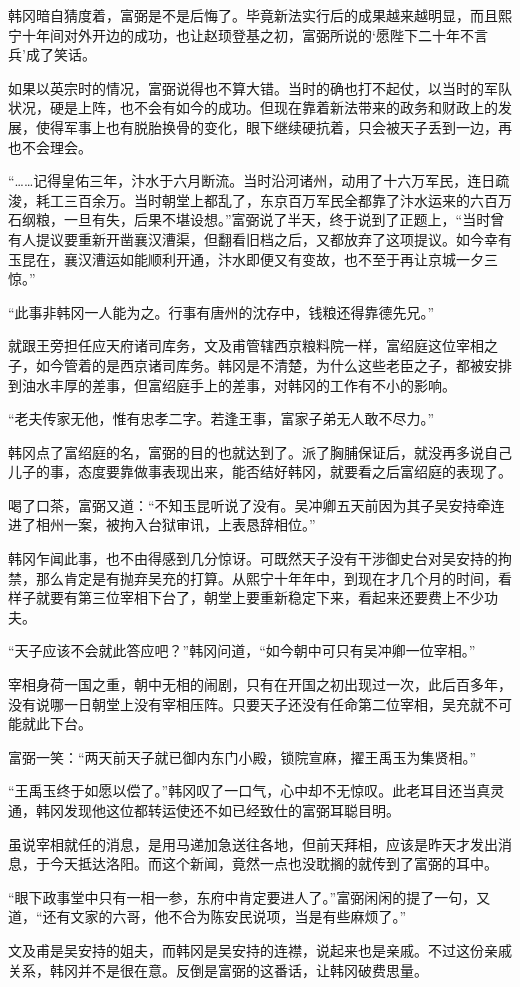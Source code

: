 韩冈暗自猜度着，富弼是不是后悔了。毕竟新法实行后的成果越来越明显，而且熙宁十年间对外开边的成功，也让赵顼登基之初，富弼所说的‘愿陛下二十年不言兵’成了笑话。

如果以英宗时的情况，富弼说得也不算大错。当时的确也打不起仗，以当时的军队状况，硬是上阵，也不会有如今的成功。但现在靠着新法带来的政务和财政上的发展，使得军事上也有脱胎换骨的变化，眼下继续硬抗着，只会被天子丢到一边，再也不会理会。

“……记得皇佑三年，汴水于六月断流。当时沿河诸州，动用了十六万军民，连日疏浚，耗工三百余万。当时朝堂上都乱了，东京百万军民全都靠了汴水运来的六百万石纲粮，一旦有失，后果不堪设想。”富弼说了半天，终于说到了正题上，“当时曾有人提议要重新开凿襄汉漕渠，但翻看旧档之后，又都放弃了这项提议。如今幸有玉昆在，襄汉漕运如能顺利开通，汴水即便又有变故，也不至于再让京城一夕三惊。”

“此事非韩冈一人能为之。行事有唐州的沈存中，钱粮还得靠德先兄。”

就跟王旁担任应天府诸司库务，文及甫管辖西京粮料院一样，富绍庭这位宰相之子，如今管着的是西京诸司库务。韩冈是不清楚，为什么这些老臣之子，都被安排到油水丰厚的差事，但富绍庭手上的差事，对韩冈的工作有不小的影响。

“老夫传家无他，惟有忠孝二字。若逢王事，富家子弟无人敢不尽力。”

韩冈点了富绍庭的名，富弼的目的也就达到了。派了胸脯保证后，就没再多说自己儿子的事，态度要靠做事表现出来，能否结好韩冈，就要看之后富绍庭的表现了。

喝了口茶，富弼又道：“不知玉昆听说了没有。吴冲卿五天前因为其子吴安持牵连进了相州一案，被拘入台狱审讯，上表恳辞相位。”

韩冈乍闻此事，也不由得感到几分惊讶。可既然天子没有干涉御史台对吴安持的拘禁，那么肯定是有抛弃吴充的打算。从熙宁十年年中，到现在才几个月的时间，看样子就要有第三位宰相下台了，朝堂上要重新稳定下来，看起来还要费上不少功夫。

“天子应该不会就此答应吧？”韩冈问道，“如今朝中可只有吴冲卿一位宰相。”

宰相身荷一国之重，朝中无相的闹剧，只有在开国之初出现过一次，此后百多年，没有说哪一日朝堂上没有宰相压阵。只要天子还没有任命第二位宰相，吴充就不可能就此下台。

富弼一笑：“两天前天子就已御内东门小殿，锁院宣麻，擢王禹玉为集贤相。”

“王禹玉终于如愿以偿了。”韩冈叹了一口气，心中却不无惊叹。此老耳目还当真灵通，韩冈发现他这位都转运使还不如已经致仕的富弼耳聪目明。

虽说宰相就任的消息，是用马递加急送往各地，但前天拜相，应该是昨天才发出消息，于今天抵达洛阳。而这个新闻，竟然一点也没耽搁的就传到了富弼的耳中。

“眼下政事堂中只有一相一参，东府中肯定要进人了。”富弼闲闲的提了一句，又道，“还有文家的六哥，他不合为陈安民说项，当是有些麻烦了。”

文及甫是吴安持的姐夫，而韩冈是吴安持的连襟，说起来也是亲戚。不过这份亲戚关系，韩冈并不是很在意。反倒是富弼的这番话，让韩冈破费思量。

